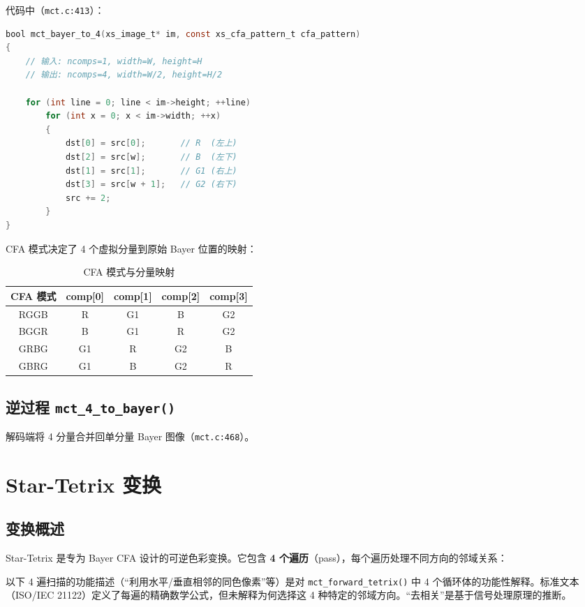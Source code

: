 代码中（\texttt{mct.c:413}）：

\begin{lstlisting}[language=C,numbers=none]
bool mct_bayer_to_4(xs_image_t* im, const xs_cfa_pattern_t cfa_pattern)
{
    // 输入: ncomps=1, width=W, height=H
    // 输出: ncomps=4, width=W/2, height=H/2

    for (int line = 0; line < im->height; ++line)
        for (int x = 0; x < im->width; ++x)
        {
            dst[0] = src[0];       // R  (左上)
            dst[2] = src[w];       // B  (左下)
            dst[1] = src[1];       // G1 (右上)
            dst[3] = src[w + 1];   // G2 (右下)
            src += 2;
        }
}
\end{lstlisting}

CFA 模式决定了 4 个虚拟分量到原始 Bayer 位置的映射：

\begin{table}[H]
\centering
\caption{CFA 模式与分量映射}
\begin{tabular}{@{}ccccc@{}}
\toprule
CFA 模式 & comp[0] & comp[1] & comp[2] & comp[3] \\
\midrule
RGGB & R & G1 & B & G2 \\
BGGR & B & G1 & R & G2 \\
GRBG & G1 & R & G2 & B \\
GBRG & G1 & B & G2 & R \\
\bottomrule
\end{tabular}
\end{table}

\subsection{逆过程 \texttt{mct\_4\_to\_bayer()}}

解码端将 4 分量合并回单分量 Bayer 图像（\texttt{mct.c:468}）。

\section{Star-Tetrix 变换}

\subsection{变换概述}

Star-Tetrix 是专为 Bayer CFA 设计的可逆色彩变换。它包含 \textbf{4 个遍历}（pass），每个遍历处理不同方向的邻域关系：

\begin{engineeringnote}
以下 4 遍扫描的功能描述（``利用水平/垂直相邻的同色像素''等）是对 \texttt{mct\_forward\_tetrix()} 中 4 个循环体的功能性解释。标准文本（ISO/IEC 21122）定义了每遍的精确数学公式，但未解释为何选择这 4 种特定的邻域方向。``去相关''是基于信号处理原理的推断。
\end{engineeringnote}

